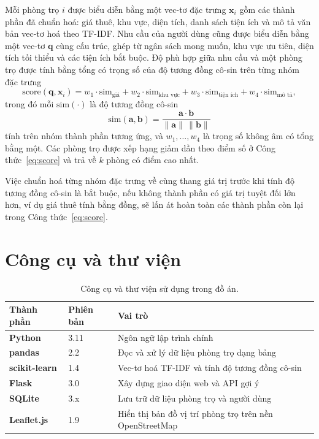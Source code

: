 Mỗi phòng trọ $i$ được biểu diễn bằng một vec-tơ đặc trưng $\mathbf{x}_i$
gồm các thành phần đã chuẩn hoá: giá thuê, khu vực, diện tích, danh sách
tiện ích và mô tả văn bản vec-tơ hoá theo TF-IDF. Nhu cầu của người dùng
cũng được biểu diễn bằng một vec-tơ $\mathbf{q}$ cùng cấu trúc, ghép từ
ngân sách mong muốn, khu vực ưu tiên, diện tích tối thiểu và các tiện ích
bắt buộc. Độ phù hợp giữa nhu cầu và một phòng trọ được tính bằng tổng có
trọng số của độ tương đồng cô-sin trên từng nhóm đặc trưng
\begin{equation}
\mathrm{score}(\mathbf{q}, \mathbf{x}_i) =
  w_1 \cdot \mathrm{sim}_{\text{giá}} +
  w_2 \cdot \mathrm{sim}_{\text{khu vực}} +
  w_3 \cdot \mathrm{sim}_{\text{tiện ích}} +
  w_4 \cdot \mathrm{sim}_{\text{mô tả}},
\label{eq:score}
\end{equation}
trong đó mỗi $\mathrm{sim}(\cdot)$ là độ tương đồng cô-sin
\begin{equation}
\mathrm{sim}(\mathbf{a}, \mathbf{b}) =
  \frac{\mathbf{a} \cdot \mathbf{b}}{\lVert \mathbf{a} \rVert \, \lVert \mathbf{b} \rVert}
\label{eq:cosine}
\end{equation}
tính trên nhóm thành phần tương ứng, và $w_1, \dots, w_4$ là trọng số không
âm có tổng bằng một. Các phòng trọ được xếp hạng giảm dần theo điểm số ở
Công thức~\eqref{eq:score} và trả về $k$ phòng có điểm cao nhất.

\begin{ghinho}
Việc chuẩn hoá từng nhóm đặc trưng về cùng thang giá trị trước khi tính độ
tương đồng cô-sin là bắt buộc, nếu không thành phần có giá trị tuyệt đối
lớn hơn, ví dụ giá thuê tính bằng đồng, sẽ lấn át hoàn toàn các thành phần
còn lại trong Công thức~\eqref{eq:score}.
\end{ghinho}

\section{Công cụ và thư viện}

\begin{table}[H]
\centering
\caption{Công cụ và thư viện sử dụng trong đồ án.}
\label{tab:congcu}
\begin{tabular*}{\textwidth}{@{\extracolsep{\fill}}>{\bfseries\color{daunavy}}l >{\color{daumaroon}}l l}
\toprule
\rowcolor{gray100}\bfseries\color{daunavy}Thành phần & \bfseries\color{daumaroon}Phiên bản & \bfseries\color{daunavy}Vai trò \\
\midrule
Python       & 3.11 & Ngôn ngữ lập trình chính \\
pandas       & 2.2  & Đọc và xử lý dữ liệu phòng trọ dạng bảng \\
scikit-learn & 1.4  & Vec-tơ hoá TF-IDF và tính độ tương đồng cô-sin \\
Flask        & 3.0  & Xây dựng giao diện web và API gợi ý \\
SQLite       & 3.x  & Lưu trữ dữ liệu phòng trọ và người dùng \\
Leaflet.js   & 1.9  & Hiển thị bản đồ vị trí phòng trọ trên nền OpenStreetMap \\
\bottomrule
\end{tabular*}
\end{table}

